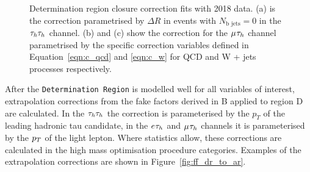 \begin{figure}[!hbtp]
\centering
\caption{Determination region closure correction fits with 2018 data. (a) is the correction parametrised by $\Delta R$ in events with $N_{\text{b jets}}=0$ in the $\tau_{h}\tau_{h}$ channel. (b) and (c) show the correction for the $\mu_{}\tau_{h}$ channel parametrised by the specific correction variables defined in Equation~\ref{eqn:c_qcd} and \ref{eqn:c_w} for QCD and W + jets processes respectively.}
\label{fig:ff_dr}
\end{figure}

After the \texttt{Determination Region} is modelled well for all variables of interest, extrapolation corrections from the fake factors derived in B applied to region D are calculated.
In the $\tau_{h}\tau_{h}$ the correction is parameterised by the $p_{T}$ of the leading hadronic tau candidate, in the $e_{}\tau_{h}$ and $\mu_{}\tau_{h}$ channels it is parameterised by the $p_{T}$ of the light lepton.
Where statistics allow, these corrections are calculated in the high mass optimisation procedure categories.
Examples of the extrapolation corrections are shown in Figure~\ref{fig:ff_dr_to_ar}.


